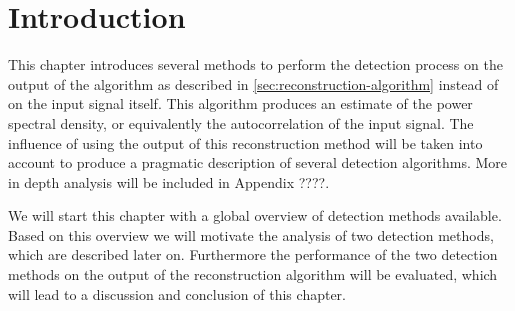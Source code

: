 \documentclass[a4paper, openany, oneside]{memoir}
\begin{document}
\section{Introduction}
This chapter introduces several methods to perform the detection process on the output of the algorithm as described in \cref{sec:reconstruction-algorithm} instead of on the input signal itself. This algorithm produces an estimate of the power spectral density, or equivalently the autocorrelation of the input signal. The influence of using the output of this reconstruction method will be taken into account to produce a pragmatic description of several detection algorithms.  More in depth analysis will be included in Appendix ????.

We will start this chapter with a global overview of detection methods available. Based on this overview we will motivate the analysis of two detection methods, which are described later on. Furthermore the performance of the two detection methods on the output of the reconstruction algorithm will be evaluated, which will lead to a discussion and conclusion of this chapter.
\end{document}
